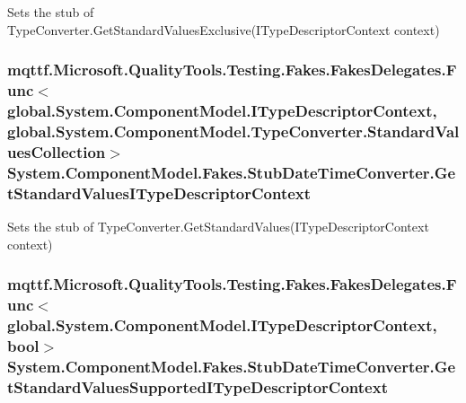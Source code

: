 Sets the stub of Type\-Converter.\-Get\-Standard\-Values\-Exclusive(\-I\-Type\-Descriptor\-Context context)

\hypertarget{class_system_1_1_component_model_1_1_fakes_1_1_stub_date_time_converter_a7656f5631635d05118250e51052918bd}{
\subsubsection[{Get\-Standard\-Values\-I\-Type\-Descriptor\-Context}]{\setlength{\rightskip}{0pt plus 5cm}mqttf.\-Microsoft.\-Quality\-Tools.\-Testing.\-Fakes.\-Fakes\-Delegates.\-Func$<$global.\-System.\-Component\-Model.\-I\-Type\-Descriptor\-Context, global.\-System.\-Component\-Model.\-Type\-Converter.\-Standard\-Values\-Collection$>$ System.\-Component\-Model.\-Fakes.\-Stub\-Date\-Time\-Converter.\-Get\-Standard\-Values\-I\-Type\-Descriptor\-Context}}\label{class_system_1_1_component_model_1_1_fakes_1_1_stub_date_time_converter_a7656f5631635d05118250e51052918bd}


Sets the stub of Type\-Converter.\-Get\-Standard\-Values(\-I\-Type\-Descriptor\-Context context)

\hypertarget{class_system_1_1_component_model_1_1_fakes_1_1_stub_date_time_converter_a818f2540470e4aee1d7a0a2afb5e85f9}{
\subsubsection[{Get\-Standard\-Values\-Supported\-I\-Type\-Descriptor\-Context}]{\setlength{\rightskip}{0pt plus 5cm}mqttf.\-Microsoft.\-Quality\-Tools.\-Testing.\-Fakes.\-Fakes\-Delegates.\-Func$<$global.\-System.\-Component\-Model.\-I\-Type\-Descriptor\-Context, bool$>$ System.\-Component\-Model.\-Fakes.\-Stub\-Date\-Time\-Converter.\-Get\-Standard\-Values\-Supported\-I\-Type\-Descriptor\-Context}}\label{class_system_1_1_component_model_1_1_fakes_1_1_stub_date_time_converter_a818f2540470e4aee1d7a0a2afb5e85f9}


